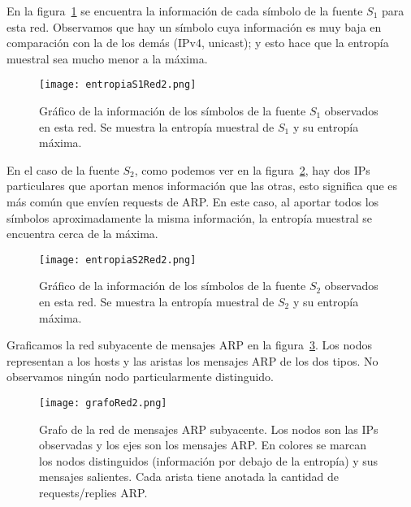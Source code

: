 En la figura~\ref{entropias1_2} se encuentra la información de cada símbolo de la fuente $S_1$ para esta red. Observamos que hay un símbolo cuya información es muy baja en comparación con la de los demás (IPv4, unicast); y esto hace que la entropía muestral sea mucho menor a la máxima.

\begin{figure}[H]
\centering
\texttt{[image: entropiaS1Red2.png]}
\caption{Gráfico de la información de los símbolos de la fuente $S_1$ observados en esta red. Se muestra la entropía muestral de $S_1$ y su entropía máxima.}
\label{entropias1_2}
\end{figure}

En el caso de la fuente $S_2$, como podemos ver en la figura~\ref{entropias2_2}, hay dos IPs particulares que aportan menos información que las otras, esto significa que es más común que envíen requests de ARP. En este caso, al aportar todos los símbolos aproximadamente la misma información, la entropía muestral se encuentra cerca de la máxima.

\begin{figure}[H]
\centering
\texttt{[image: entropiaS2Red2.png]}
\caption{Gráfico de la información de los símbolos de la fuente $S_2$ observados en esta red. Se muestra la entropía muestral de $S_2$ y su entropía máxima.}
\label{entropias2_2}
\end{figure}

Graficamos la red subyacente de mensajes ARP en la figura~\ref{grafo2}. Los nodos representan a los hosts y las aristas los mensajes ARP de los dos tipos. No observamos ningún nodo particularmente distinguido.

\begin{figure}[H]
\centering
\texttt{[image: grafoRed2.png]}
\caption{Grafo de la red de mensajes ARP subyacente. Los nodos son las IPs observadas y los ejes son los mensajes ARP. En colores se marcan los nodos distinguidos (información por debajo de la entropía) y sus mensajes salientes. Cada arista tiene anotada la cantidad de requests/replies ARP.}
\label{grafo2}
\end{figure}
